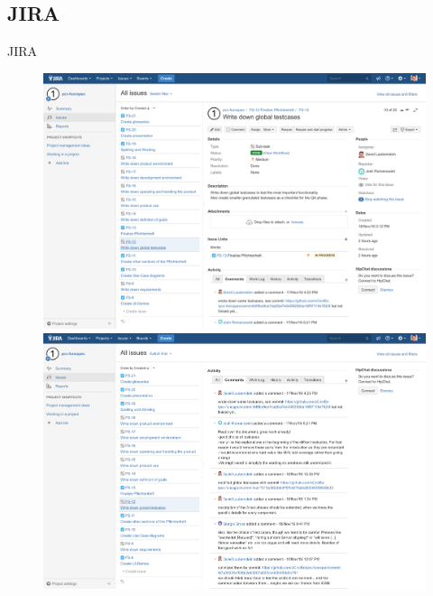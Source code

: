 \documentclass[19pt]{beamer}
\begin{document}
\subsection{JIRA}
\begin{frame}[allowframebreaks]{JIRA}
	\begin{figure}
		\begin{center}
			\includegraphics[scale=0.18]{logos/JIRA01} 
		\end{center}
		\framebreak
		\begin{center}
			\includegraphics[scale=0.18]{logos/JIRA02} 
		\end{center}
	\end{figure}				
\end{frame}
\end{document}
